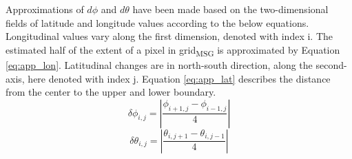 Approximations of $d\phi$ and $d\theta$ have been made based on the two-dimensional fields of latitude and longitude values according to the below equations.
Longitudinal values vary along the first dimension, denoted with index i. The estimated half of the extent of a pixel in grid\textsubscript{MSG} is approximated by Equation \eqref{eq:app_lon}. Latitudinal changes are in north-south direction, along the second-axis, here denoted with index j. Equation \eqref{eq:app_lat} describes the distance from the center to the upper and lower boundary.
\begin{equation} \label{eq:app_lon}
    \delta \phi_{i,j} = \left| \frac{\phi_{i+1,j} - \phi_{i-1, j}}{4} \right|
\end{equation}
\begin{equation} \label{eq:app_lat}
    \delta \theta_{i,j} = \left| \frac{\theta_{i,j+1} - \theta_{i, j-1}}{4} \right|
\end{equation}

